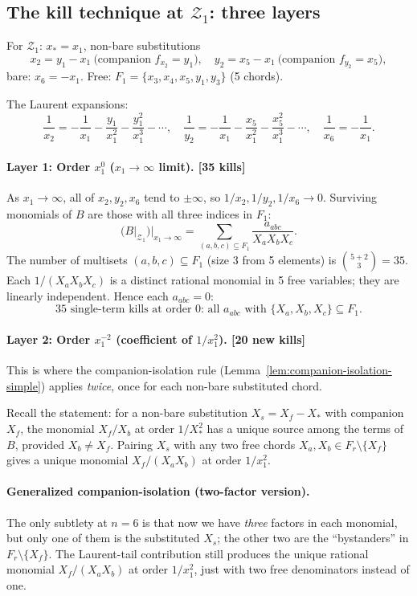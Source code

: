 \documentclass[11pt]{article}
\newcommand{\Z}{\mathcal{Z}}
\theoremstyle{definition}
\begin{document}
\subsection{The kill technique at \texorpdfstring{$\Z_1$}{Z1}: three layers}

For $\Z_1$: $x_*=x_1$, non-bare substitutions
\[
x_2=y_1-x_1\ \text{(companion $f_{x_2}=y_1$)},\quad y_2=x_5-x_1\ \text{(companion $f_{y_2}=x_5$)},
\]
bare: $x_6=-x_1$. Free: $F_1=\{x_3,x_4,x_5,y_1,y_3\}$ (5 chords).

The Laurent expansions:
\[
\frac{1}{x_2}=-\frac{1}{x_1}-\frac{y_1}{x_1^2}-\frac{y_1^2}{x_1^3}-\cdots,
\quad
\frac{1}{y_2}=-\frac{1}{x_1}-\frac{x_5}{x_1^2}-\frac{x_5^2}{x_1^3}-\cdots,
\quad
\frac{1}{x_6}=-\frac{1}{x_1}.
\]

\paragraph{Layer 1: Order $x_1^0$ ($x_1\to\infty$ limit). [\textbf{35 kills}]}

As $x_1\to\infty$, all of $x_2,y_2,x_6$ tend to $\pm\infty$, so $1/x_2,1/y_2,1/x_6\to 0$.
Surviving monomials of $B$ are those with all three indices in $F_1$:
\[
\bigl(B|_{\Z_1}\bigr)\bigr|_{x_1\to\infty} = \sum_{(a,b,c)\subseteq F_1}\frac{a_{abc}}{X_a X_b X_c}.
\]
The number of multisets $(a,b,c)\subseteq F_1$ (size 3 from 5 elements) is $\binom{5+2}{3}=35$.
Each $1/(X_aX_bX_c)$ is a distinct rational monomial in 5 free variables;
they are linearly independent. Hence each $a_{abc}=0$:
\[
\boxed{\text{35 single-term kills at order 0: all }a_{abc}\text{ with }\{X_a,X_b,X_c\}\subseteq F_1.}
\]

\paragraph{Layer 2: Order $x_1^{-2}$ (coefficient of $1/x_1^2$). [\textbf{20 new kills}]}

This is where the companion-isolation rule (Lemma~\ref{lem:companion-isolation-simple})
applies \emph{twice}, once for each non-bare substituted chord.

Recall the statement: for a non-bare substitution $X_s = X_f - X_*$ with
companion $X_f$, the monomial $X_f/X_b$ at order $1/X_*^2$ has a unique
source among the terms of $B$, provided $X_b \ne X_f$. Pairing $X_s$ with
any two free chords $X_a, X_b \in F_r \setminus \{X_f\}$ gives a unique
monomial $X_f/(X_a X_b)$ at order $1/x_1^2$.

\paragraph{Generalized companion-isolation (two-factor version).} The only
subtlety at $n=6$ is that now we have \emph{three} factors in each monomial,
but only one of them is the substituted $X_s$; the other two are the
``bystanders'' in $F_r \setminus \{X_f\}$. The Laurent-tail contribution
still produces the unique rational monomial $X_f/(X_a X_b)$ at order
$1/x_1^2$, just with two free denominators instead of one.
\end{document}

